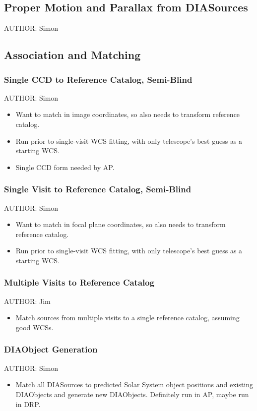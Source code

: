 \subsection{Proper Motion and Parallax from DIASources}
AUTHOR: Simon

\subsection{Association and Matching}
\subsubsection{Single CCD to Reference Catalog, Semi-Blind}
AUTHOR: Simon
\begin{itemize}
\item Want to match in image coordinates, so also needs to transform reference catalog.
\item Run prior to single-visit WCS fitting, with only telescope's best guess as a starting WCS.
\item Single CCD form needed by AP.
\end{itemize}

\subsubsection{Single Visit to Reference Catalog, Semi-Blind}
AUTHOR: Simon
\begin{itemize}
\item Want to match in focal plane coordinates, so also needs to transform reference catalog.
\item Run prior to single-visit WCS fitting, with only telescope's best guess as a starting WCS.
\end{itemize}

\subsubsection{Multiple Visits to Reference Catalog}
AUTHOR: Jim
\begin{itemize}
\item Match sources from multiple visits to a single reference catalog, assuming good WCSs.
\end{itemize}

\subsubsection{DIAObject Generation}
AUTHOR: Simon
\begin{itemize}
\item Match all DIASources to predicted Solar System object positions and existing DIAObjects and generate new DIAObjects.  Definitely run in AP, maybe run in DRP.
\end{itemize}

